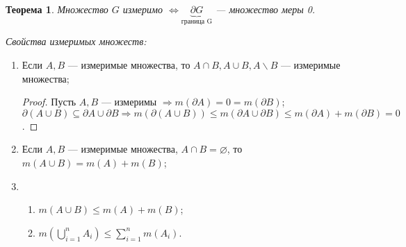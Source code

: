 \documentclass[a4paper,12pt]{article}
\let\emptyset\varnothing
\newtheorem*{theorem}{Теорема}
\theoremstyle{remark}
\theoremstyle{definition}
\begin{document}
\begin{theorem}
    Множество \(G\) измеримо \(\Leftrightarrow \underbrace{\partial G}_{\text{граница G}}\) --- множество меры 0.
\end{theorem}

\emph{Свойства измеримых множеств:}

\begin{enumerate}
    \item Если \(A, B\) --- измеримые множества, то \(A \cap B, A \cup B, A \backslash B\) --- измеримые множества;
    \begin{proof}
        Пусть \(A, B\) --- измеримы \(\Rightarrow m(\partial A) = 0 = m(\partial B)\); \(\partial(A \cup B) \subseteq \partial A \cup \partial B \Rightarrow m(\partial(A \cup B)) \leqslant m(\partial A \cup \partial B) \leqslant m(\partial A) + m(\partial B) = 0\).
    \end{proof}
    \item Если \(A, B\) --- измеримые множества, \(A \cap B = \emptyset\), то \(m(A \cup B) = m(A) + m(B)\);
    \item
    \begin{enumerate}
        \item \(m(A \cup B) \leqslant m(A) + m(B)\);
        \item \(m\left(\bigcup_{i=1}^n A_i\right) \leqslant \sum_{i=1}^n m(A_i)\).
    \end{enumerate}
\end{enumerate}
\end{document}
